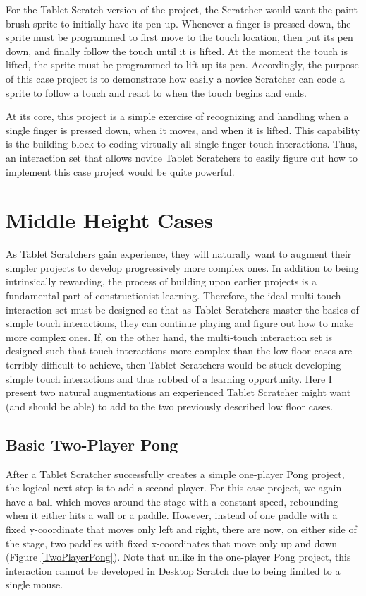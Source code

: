 For the Tablet Scratch version of the project, the Scratcher would want the paint-brush sprite to initially have its pen up. Whenever a finger is pressed down, the sprite must be programmed to first move to the touch location, then put its pen down, and finally follow the touch until it is lifted. At the moment the touch is lifted, the sprite must be programmed to lift up its pen. Accordingly, the purpose of this case project is to demonstrate how easily a novice Scratcher can code a sprite to follow a touch and react to when the touch begins and ends.
 
At its core, this project is a simple exercise of recognizing and handling when a single finger is pressed down, when it moves, and when it is lifted. This capability is the building block to coding virtually all single finger touch interactions. Thus, an interaction set that allows novice Tablet Scratchers to easily figure out how to implement this case project would be quite powerful.

\section{Middle Height Cases}
As Tablet Scratchers gain experience, they will naturally want to augment their simpler projects to develop progressively more complex ones. In addition to being intrinsically rewarding, the process of building upon earlier projects is a fundamental part of constructionist learning. Therefore, the ideal multi-touch interaction set must be designed so that as Tablet Scratchers master the basics of simple touch interactions, they can continue playing and figure out how to make more complex ones. If, on the other hand, the multi-touch interaction set is designed such that touch interactions more complex than the low floor cases are terribly difficult to achieve, then Tablet Scratchers would be stuck developing simple touch interactions and thus robbed of a learning opportunity. Here I present two natural augmentations an experienced Tablet Scratcher might want (and should be able) to add to the two previously described low floor cases. 

\subsection{Basic Two-Player Pong}
After a Tablet Scratcher successfully creates a simple one-player Pong project, the logical next step is to add a second player. For this case project, we again have a ball which moves around the stage with a constant speed, rebounding when it either hits a wall or a paddle. However, instead of one paddle with a fixed y-coordinate that moves only left and right, there are now, on either side of the stage, two paddles with fixed x-coordinates that move only up and down (Figure \ref{TwoPlayerPong}). Note that unlike in the one-player Pong project, this interaction cannot be developed in Desktop Scratch due to being limited to a single mouse.

